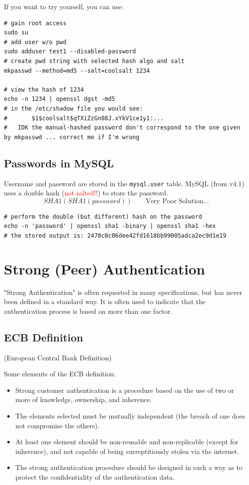 If you want to try yourself, you can use:
\begin{lstlisting}[style=bashStyle]
# gain root access
sudo su
# add user w/o pwd
sudo adduser test1 --disabled-password
# create pwd string with selected hash algo and salt
mkpasswd --method=md5 --salt=coolsalt 1234

# view the hash of 1234
echo -n 1234 | openssl dgst -md5
# in the /etc/shadow file you would see: 
#       $1$coolsalt$qTXiZzGn08J.xYkV1ce1y1:...
#   IDK the manual-hashed password don't correspond to the one given by mkpasswd ... correct me if I'm wrong
\end{lstlisting}

\subsection*{Passwords in MySQL}
Username and password are stored in the \texttt{mysql.user} table. MySQL (from v4.1) uses a double hash (\textcolor{Red}{not salted!!}) to store the password.
\[SHA1(SHA1(password)) \qquad \text{Very Poor Solution...}\]
\begin{lstlisting}[style=bashStyle]
# perform the double (but different) hash on the password
echo -n 'password' | openssl sha1 -binary | openssl sha1 -hex
# the stored output is: 2470c0c06dee42fd1618bb99005adca2ec9d1e19

\end{lstlisting}

\section{Strong (Peer) Authentication}
"Strong Authentication" is often requested in many specifications, but has never been defined in a standard way. It is often used to indicate that the authentication process is based on more than one factor.

\subsection*{ECB Definition}
\begin{center}
    (European Central Bank Definition)
\end{center}
Some elements of the ECB definition:
\begin{itemize}
    \item Strong customer authentication is a procedure based on the use of two or more of knowledge, ownership, and inherence. 
    \item The elements selected must be mutually independent (the breach of one does not compromise the others).
    \item At least one element should be non-reusable and non-replicable (except for inherence), and not capable of being surreptitiously stolen via the internet.
    \item The strong authentication procedure should be designed in such a way as to protect the confidentiality of the authentication data.
\end{itemize}


